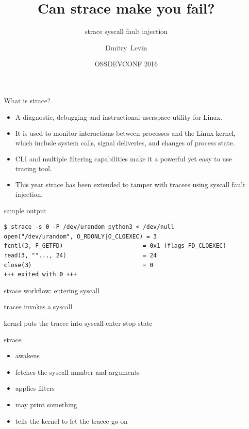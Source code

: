 \documentclass[unicode,aspectratio=169]{beamer}
\title{\Huge Can strace make you fail?}
\subtitle{\huge strace syscall fault injection}
\author{\Huge Dmitry~Levin}
\date{OSSDEVCONF 2016}
\begin{document}
\begin{frame}
\titlepage
\end{frame}

\begin{frame}[fragile]{What is strace?}
\begin{itemize}
	\item A diagnostic, debugging and instructional userspace
	utility for Linux.

	\item It is used to monitor interactions between processes and
	the Linux kernel, which include system calls, signal
	deliveries, and changes of process state.

	\item CLI and multiple filtering capabilities make it a powerful
	yet easy to use tracing tool.

	\item This year strace has been extended to tamper with tracees
	using syscall fault injection.
\end{itemize}
\scriptsize
\begin{block}{\large sample output}
\begin{verbatim}
$ strace -s 0 -P /dev/urandom python3 < /dev/null
open("/dev/urandom", O_RDONLY|O_CLOEXEC) = 3
fcntl(3, F_GETFD)                       = 0x1 (flags FD_CLOEXEC)
read(3, ""..., 24)                      = 24
close(3)                                = 0
+++ exited with 0 +++
\end{verbatim}
\end{block}
\end{frame}

\begin{frame}{strace workflow: entering syscall}
\begin{block}{\large tracee}
	invokes a syscall
\end{block}
\begin{block}{\large kernel}
	puts the tracee into {\sc syscall-enter-stop} state
\end{block}
\begin{block}{\large strace}
\begin{itemize}
	\item awakens
	\item fetches the syscall number and arguments
	\item applies filters
	\item may print something
	\item tells the kernel to let the tracee go on
\end{itemize}
\end{block}
\end{frame}
\end{document}
